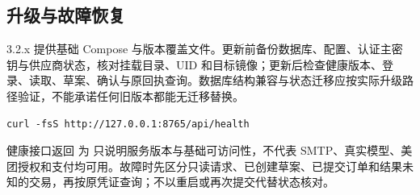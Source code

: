 \subsection{升级与故障恢复}
3.2.x 提供基础 Compose 与版本覆盖文件。更新前备份数据库、配置、认证主密钥与供应商状态，核对挂载目录、UID 和目标镜像；更新后检查健康版本、登录、读取、草案、确认与原回执查询。数据库结构兼容与状态迁移应按实际升级路径验证，不能承诺任何旧版本都能无迁移替换。

\begin{lstlisting}
curl -fsS http://127.0.0.1:8765/api/health
\end{lstlisting}
健康接口返回  为  只说明服务版本与基础可访问性，不代表 SMTP、真实模型、美团授权和支付均可用。故障时先区分只读请求、已创建草案、已提交订单和结果未知的交易，再按原凭证查询；不以重启或再次提交代替状态核对。
